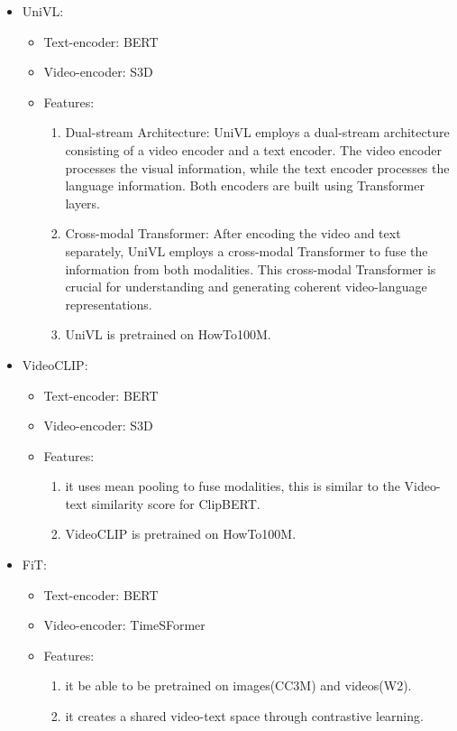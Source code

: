 \begin{itemize}
\item UniVL:
\begin{itemize}
\item Text-encoder: BERT
\item Video-encoder: S3D
\item Features:
\begin{enumerate}
\item Dual-stream Architecture: UniVL employs a dual-stream architecture consisting of a video encoder and a text encoder. The video encoder processes the visual information, while the text encoder processes the language information. Both encoders are built using Transformer layers.
\item Cross-modal Transformer: After encoding the video and text separately, UniVL employs a cross-modal Transformer to fuse the information from both modalities. This cross-modal Transformer is crucial for understanding and generating coherent video-language representations.
\item UniVL is pretrained on HowTo100M.
\end{enumerate}
\end{itemize}
\end{itemize}

\begin{itemize}
\item VideoCLIP:
\begin{itemize}
\item Text-encoder: BERT
\item Video-encoder: S3D
\item Features:
\begin{enumerate}
\item it uses mean pooling to fuse modalities, this is similar to the Video-text similarity score for ClipBERT.
\item VideoCLIP is pretrained on HowTo100M.
\end{enumerate}
\end{itemize}
\end{itemize}

\begin{itemize}
\item FiT:
\begin{itemize}
\item Text-encoder: BERT
\item Video-encoder: TimeSFormer
\item Features:
\begin{enumerate}
\item it be able to be pretrained on images(CC3M) and videos(W2).
\item it creates a shared video-text space through contrastive learning. 
\end{enumerate}
\end{itemize}
\end{itemize}

